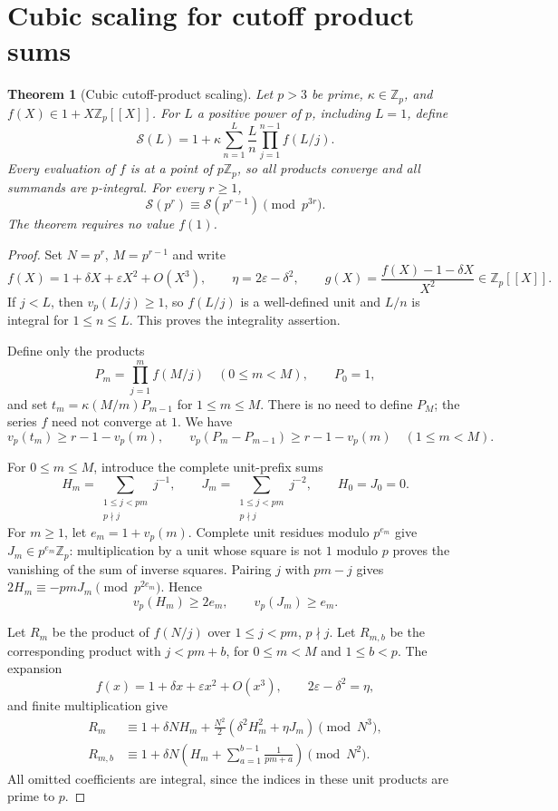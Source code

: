 \documentclass[11pt,letterpaper]{article}
\newtheorem{theorem}{Theorem}[section]
\numberwithin{equation}{section}
\begin{document}
\section{Cubic scaling for cutoff product sums}\label{loc-II-2}
\begin{theorem}[Cubic cutoff-product scaling]\label{II-thm:product-scaling}
Let $p>3$ be prime, $\kappa\in\mathbb Z_p$, and
$f(X)\in1+X\mathbb Z_p[[X]]$. For $L$ a positive power of $p$,
including $L=1$, define
\[
\mathcal S(L)=1+\kappa\sum_{n=1}^{L}\frac{L}{n}
 \prod_{j=1}^{n-1}f(L/j).
\]
Every evaluation of $f$ is at a point of $p\mathbb Z_p$, so all
products converge and all summands are $p$-integral. For every
$r\geq1$,
\[
\mathcal S(p^r)\equiv\mathcal S(p^{r-1})\pmod{p^{3r}}.
\]
The theorem requires no value $f(1)$.
\end{theorem}
\begin{proof}
Set $N=p^r$, $M=p^{r-1}$ and write
\[
f(X)=1+\delta X+\varepsilon X^2+O(X^3),\qquad
\eta=2\varepsilon-\delta^2,
\qquad g(X)=\frac{f(X)-1-\delta X}{X^2}\in\mathbb Z_p[[X]].
\]
If $j<L$, then $v_p(L/j)\geq1$, so $f(L/j)$ is a well-defined
unit and $L/n$ is integral for $1\leq n\leq L$. This proves the
integrality assertion.

Define only the products
\[
P_m=\prod_{j=1}^{m}f(M/j)\quad(0\leq m<M),\qquad P_0=1,
\]
and set $t_m=\kappa(M/m)P_{m-1}$ for $1\leq m\leq M$.
There is no need to define $P_M$; the series $f$ need not converge
at $1$. We have
\[
v_p(t_m)\geq r-1-v_p(m),
\qquad
v_p(P_m-P_{m-1})\geq r-1-v_p(m)\quad(1\leq m<M).
\]

For $0\leq m\leq M$, introduce the complete unit-prefix sums
\[
H_m=\sum_{\substack{1\leq j<pm\\p\nmid j}}j^{-1},\qquad
J_m=\sum_{\substack{1\leq j<pm\\p\nmid j}}j^{-2},
\qquad H_0=J_0=0.
\]
For $m\geq1$, let $e_m=1+v_p(m)$. Complete unit residues modulo
$p^{e_m}$ give $J_m\in p^{e_m}\mathbb Z_p$: multiplication by a
unit whose square is not $1$ modulo $p$ proves the vanishing of the
sum of inverse squares. Pairing $j$ with $pm-j$ gives
$2H_m\equiv-pmJ_m\pmod{p^{2e_m}}$. Hence
\begin{equation}\label{II-eq:gauss-prefix}
v_p(H_m)\geq2e_m,\qquad v_p(J_m)\geq e_m.
\end{equation}

Let $R_m$ be the product of $f(N/j)$ over $1\leq j<pm$, $p\nmid j$.
Let $R_{m,b}$ be the corresponding product with $j<pm+b$, for
$0\leq m<M$ and $1\leq b<p$. The expansion
\[
f(x)=1+\delta x+\varepsilon x^2+O(x^3),
\qquad 2\varepsilon-\delta^2=\eta,
\]
and finite multiplication give
\begin{align*}
R_m&\equiv1+\delta NH_m+
 \frac{N^2}{2}(\delta^2H_m^2+\eta J_m)\pmod{N^3},\\
R_{m,b}&\equiv1+\delta N\left(H_m+
 \sum_{a=1}^{b-1}\frac1{pm+a}\right)\pmod{N^2}.
\end{align*}
All omitted coefficients are integral, since the indices in these
unit products are prime to $p$.


\end{proof}
\end{document}
